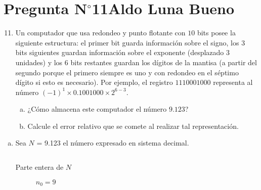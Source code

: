 \section{Pregunta N$^{\circ}$11\qquad Aldo Luna Bueno}

\begin{frame}
	\begin{enumerate}\setcounter{enumi}{10}
		\item

		      Un computador que usa redondeo y punto flotante con $10$
		      bits posee la siguiente estructura:
		      el primer bit guarda información sobre el signo, los 3 bits
		      siguientes guardan información sobre el exponente
		      (desplazado $3$ unidades) y los $6$ bits restantes guardan
		      los dígitos de la mantisa (a partir del segundo porque el
		      primero siempre es uno y con redondeo en el séptimo dígito
		      si esto es necesario).
		      Por ejemplo, el registro $1110001000$ representa al número
		      ${\left(-1\right)}^{1}\times 0.1001000\times 2^{6-3}$.

		      \begin{enumerate}[a)]
			      \item

			            ¿Cómo almacena este computador el número $9.123$?

			      \item

			            Calcule el error relativo que se comete al realizar
			            tal representación.
		      \end{enumerate}
	\end{enumerate}

	\begin{solution}
		\begin{enumerate}[a)]
			\item
			      Sea $N$ = 9.123 el número expresado en sistema decimal.

			      \begin{columns}[t]
				      \begin{column}{0.48\textwidth}
					      \begin{description}
						      \item[Parte entera de $N$]

							      $n_{0}=9$


\end{description}
\end{column}
\end{columns}
\end{enumerate}
\end{solution}
\end{frame}
